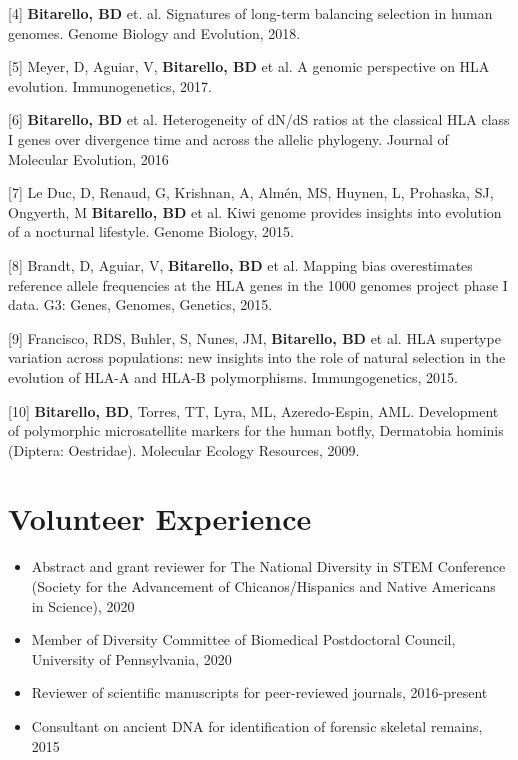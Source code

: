 \documentclass{article}
\begin{document}
[4] \textbf{Bitarello, BD} et. al. Signatures of long-term balancing selection in human genomes. Genome Biology and Evolution, 2018.


[5] Meyer, D, Aguiar, V, \textbf{Bitarello, BD} et al. A genomic perspective on HLA evolution. Immunogenetics, 2017.


[6] \textbf{Bitarello, BD} et al. Heterogeneity of dN/dS ratios at the classical HLA class I genes over divergence time and across the allelic phylogeny. Journal of Molecular Evolution, 2016


[7] Le Duc, D, Renaud, G, Krishnan, A, Almén, MS, Huynen, L, Prohaska, SJ, Ongyerth, M \textbf{Bitarello, BD} et al. Kiwi genome provides insights into evolution of a nocturnal lifestyle. Genome Biology, 2015. 

[8] Brandt, D, Aguiar, V, \textbf{Bitarello, BD} et al. Mapping bias overestimates reference allele
frequencies at the HLA genes in the 1000 genomes project phase I data. G3: Genes, Genomes, Genetics, 2015.


[9] Francisco, RDS, Buhler, S, Nunes, JM, \textbf{Bitarello, BD} et al. HLA supertype variation across populations: new insights into the role of natural selection in the evolution of HLA-A and HLA-B polymorphisms. Immungogenetics, 2015.


[10] \textbf{Bitarello, BD}, Torres, TT,  Lyra, ML, Azeredo-Espin, AML. Development of polymorphic microsatellite markers for the human botfly, Dermatobia hominis (Diptera: Oestridae). Molecular Ecology Resources, 2009.

\section{Volunteer Experience}

\begin{itemize}
\item Abstract and grant reviewer for The National Diversity in STEM Conference (Society for the Advancement of Chicanos/Hispanics and Native Americans in Science), 2020 
\item Member of Diversity Committee of Biomedical Postdoctoral Council, University of Pennsylvania, 2020
\item Reviewer of scientific manuscripts for peer-reviewed journals, 2016-present
\item Consultant on ancient DNA for identification of forensic skeletal remains, 2015
\end{itemize}
\end{document}
